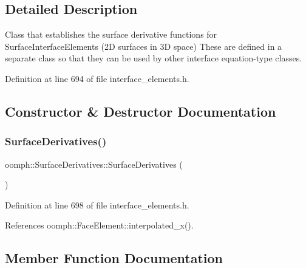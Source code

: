 \subsection{Detailed Description}
Class that establishes the surface derivative functions for Surface\+Interface\+Elements (2D surfaces in 3D space) These are defined in a separate class so that they can be used by other interface equation-\/type classes. 

Definition at line 694 of file interface\+\_\+elements.\+h.



\subsection{Constructor \& Destructor Documentation}
\mbox{\label{classoomph_1_1SurfaceDerivatives_a7bd520c805a4444073f5b05501d747fd}} 
\subsubsection{\texorpdfstring{Surface\+Derivatives()}{SurfaceDerivatives()}}
{\footnotesize\ttfamily oomph\+::\+Surface\+Derivatives\+::\+Surface\+Derivatives (\begin{DoxyParamCaption}{ }\end{DoxyParamCaption})\hspace{0.3cm}{\ttfamily [inline]}}



Definition at line 698 of file interface\+\_\+elements.\+h.



References oomph\+::\+Face\+Element\+::interpolated\+\_\+x().



\subsection{Member Function Documentation}
\mbox{\label{classoomph_1_1SurfaceDerivatives_a44e841bfa4ad82dcb87e672c821ffde7}} 
